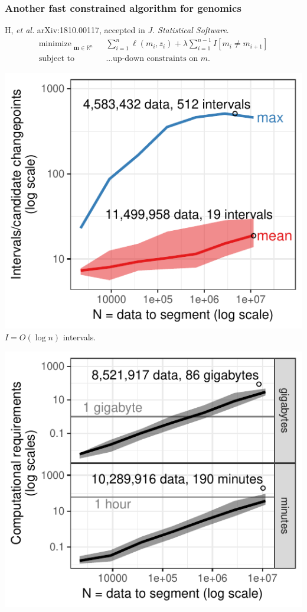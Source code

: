 \documentclass{beamer}
\DeclareMathOperator*{\minimize}{minimize}
\newcommand{\RR}{\mathbb R}
\begin{document}
\begin{frame}[fragile]
  \frametitle{Another fast constrained algorithm for genomics}

  H, {\it et al.} arXiv:1810.00117, accepted in \emph{J.
    Statistical Software}.
\vskip -0.5cm
\begin{align*}
    \minimize_{\substack{
  \mathbf m\in\RR^{n}
  }} &\ \ 
    \sum_{i=1}^n \ell( m_i,  z_i)  + \lambda{\sum_{i=1}^{n-1}I[m_{i}\neq m_{i+1}]}
\\
      \text{subject to} &\ \ \text{...up-down constraints on $m$.}
  \nonumber 
\end{align*}

  \begin{minipage}{0.48\textwidth}
    \includegraphics[width=\textwidth]{jss-figure-target-intervals-models}
    $I=O(\log n)$ intervals.
  \end{minipage}
  \begin{minipage}{0.48\textwidth}
    \includegraphics[width=\textwidth]{jss-figure-target-intervals-models-computation}

\end{minipage}
\end{frame}
\end{document}

